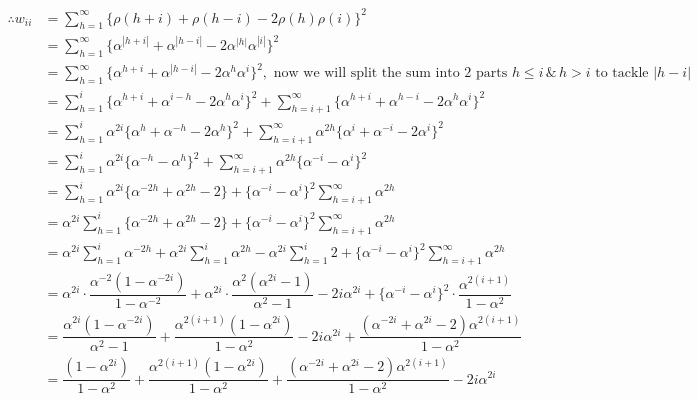 \documentclass[11pt, a4paper]{article}
\numberwithin{equation}{section}
\theoremstyle{definition}
\begin{document}
\begin{align*}
\therefore w_{ii} &= \sum \limits_{h = 1}^{\infty} \{\rho(h+i) + \rho(h-i) - 2\rho(h)\rho(i)\}^2 \\[0.25em]
&= \sum \limits_{h = 1}^{\infty} \{\alpha^{|h+i|} + \alpha^{|h-i|} - 2\alpha^{|h|}\alpha^{|i|}\}^2 \\[0.25em]
&= \sum \limits_{h = 1}^{\infty} \{\alpha^{h+i} + \alpha^{|h-i|} - 2\alpha^{h}\alpha^{i}\}^2, \text{ now we will split the sum into 2 parts } h \leq i \, \& \, h > i \text{ to tackle }|h-i| \\[0.25em]
&= \sum \limits_{h = 1}^{i} \{\alpha^{h+i} + \alpha^{i-h} - 2\alpha^{h}\alpha^{i}\}^2 + \sum \limits_{h = i+1}^{\infty} \{\alpha^{h+i} + \alpha^{h-i} - 2\alpha^{h}\alpha^{i}\}^2 \\[0.25em]
&= \sum \limits_{h = 1}^{i} \alpha^{2i} \{\alpha^{h} + \alpha^{-h} - 2\alpha^{h}\}^2 + \sum \limits_{h = i+1}^{\infty} \alpha^{2h}\{\alpha^{i} + \alpha^{-i} - 2\alpha^{i}\}^2 \\[0.25em]
&= \sum \limits_{h = 1}^{i} \alpha^{2i} \{\alpha^{-h} - \alpha^{h}\}^2 + \sum \limits_{h = i+1}^{\infty} \alpha^{2h}\{\alpha^{-i} - \alpha^{i}\}^2 \\[0.25em]
&= \sum \limits_{h = 1}^{i} \alpha^{2i} \{\alpha^{-2h} + \alpha^{2h} - 2\} + \{\alpha^{-i} - \alpha^{i}\}^2 \sum \limits_{h = i+1}^{\infty} \alpha^{2h} \\[0.25em]
&= \alpha^{2i} \sum \limits_{h = 1}^{i} \{\alpha^{-2h} + \alpha^{2h} - 2\} + \{\alpha^{-i} - \alpha^{i}\}^2 \sum \limits_{h = i+1}^{\infty} \alpha^{2h} \\[0.25em]
&= \alpha^{2i} \sum \limits_{h = 1}^{i} \alpha^{-2h} + \alpha^{2i} \sum \limits_{h = 1}^{i} \alpha^{2h} - \alpha^{2i} \sum \limits_{h = 1}^{i} 2 + \{\alpha^{-i} - \alpha^{i}\}^2 \sum \limits_{h = i+1}^{\infty} \alpha^{2h} \\[0.35em]
&= \alpha^{2i} \cdot \dfrac{\alpha^{-2} (1 - \alpha^{-2i})}{1 - \alpha^{-2}} + \alpha^{2i} \cdot \dfrac{\alpha^{2} (\alpha^{2i} - 1)}{\alpha^{2} - 1} - 2i \alpha^{2i} + \{\alpha^{-i} - \alpha^{i}\}^2 \cdot \dfrac{\alpha^{2(i+1)}}{1-\alpha^{2}} \\[0.35em]
&= \dfrac{\alpha^{2i} (1 - \alpha^{-2i})}{\alpha^{2} -  1} + \dfrac{\alpha^{2(i+1)} (1 - \alpha^{2i})}{1 - \alpha^{2}} - 2i \alpha^{2i} + \dfrac{(\alpha^{-2i} + \alpha^{2i} - 2)\alpha^{2(i+1)}}{1-\alpha^{2}} \\[0.35em]
&= \dfrac{(1 - \alpha^{2i})}{1 - \alpha^{2}} + \dfrac{\alpha^{2(i+1)} (1 - \alpha^{2i})}{1 - \alpha^{2}} + \dfrac{(\alpha^{-2i} + \alpha^{2i} - 2)\alpha^{2(i+1)}}{1-\alpha^{2}} - 2i \alpha^{2i}  \\[0.35em]

\end{align*}
\end{document}
